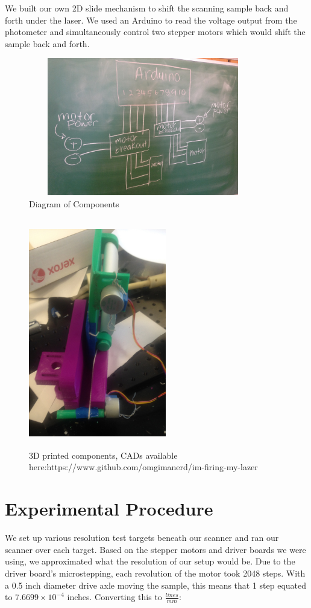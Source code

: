 \documentclass[letterpaper, 12pt]{article}
\begin{document}
\par
We built our own 2D slide mechanism to shift the scanning sample back and forth under the laser. We used an Arduino to read the voltage output from the photometer and simultaneously control two stepper motors which would shift the sample back and forth.

\begin{figure}[H]
  \centering
  \includegraphics[width=10cm,height=6cm]{circuit}
  \caption{Diagram of Components}
\end{figure}

\begin{figure}[H]
  \centering
  \includegraphics[width=6cm,height=10cm]{setup}
  \caption[caption]{3D printed components, CADs available here:\hspace{\textwidth}https://www.github.com/omgimanerd/im-firing-my-lazer}
\end{figure}

\section{Experimental Procedure}
\par
We set up various resolution test targets beneath our scanner and ran our scanner over each target. Based on the stepper motors and driver boards we were using\footnotemark, we approximated what the resolution of our setup would be.
Due to the driver board's microstepping, each revolution of the motor took 2048 steps. With a 0.5 inch diameter drive axle moving the sample, this means that 1 step equated to \( 7.6699 \times 10^{-4} \) inches. Converting this to \( \frac{lines}{mm}\):
\end{document}
